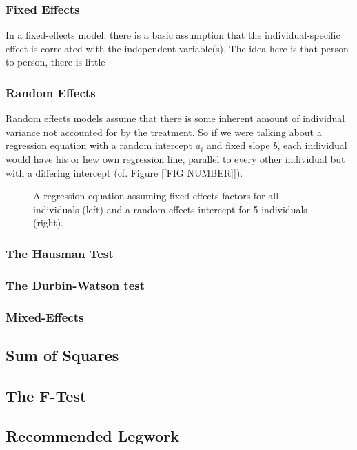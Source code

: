 \subsubsection{Fixed Effects}

In a fixed-effects model, there is a basic assumption that the individual-specific effect is correlated with the independent variable(s). The idea here is that person-to-person, there is little

\subsubsection{Random Effects}

Random effects models assume that there is some inherent amount of individual variance not accounted for by the treatment. So if we were talking about a regression equation with a random intercept $a_i$ and fixed slope $b$, each individual would have his or hew own regression line, parallel to every other individual but with a differing intercept (cf. Figure [[FIG NUMBER]]).

\begin{figure}[h]
\caption{A regression equation assuming fixed-effects factors for all individuals (left) and a random-effects intercept for 5 individuals (right).}
\end{figure}

\subsubsection{The Hausman Test}

\subsubsection{The Durbin-Watson test}

\subsubsection{Mixed-Effects}

\subsection{Sum of Squares}

\subsection{The F-Test}

\subsection{Recommended Legwork}

